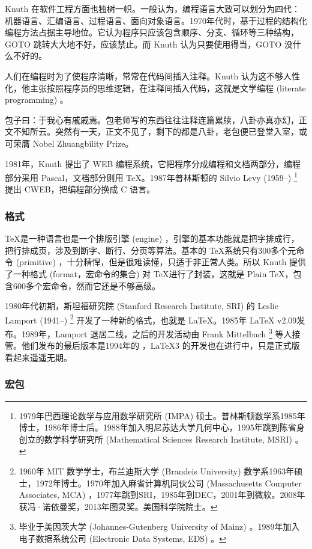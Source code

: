 Knuth 在软件工程方面也独树一帜。一般认为，编程语言大致可以划分为四代：机器语言、汇编语言、过程语言、面向对象语言。1970年代时，基于过程的结构化编程方法占据主导地位。它认为程序只应该包含顺序、分支、循环等三种结构，GOTO 跳转大大地不好，应该禁止。而 Knuth 认为只要使用得当，GOTO 没什么不好的。

人们在编程时为了使程序清晰，常常在代码间插入注释。Knuth 认为这不够人性化，他主张按照程序员的思维逻辑，在注释间插入代码，这就是文学编程 (literate programming) 。

包子曰：于我心有戚戚焉。包老师写的东西往往注释连篇累牍，八卦亦真亦幻，正文不知所云。突然有一天，正文不见了，剩下的都是八卦，老包便已登堂入室，或可荣膺 Nobel Zhuangbility Prize。

1981年，Knuth\indexKnuth{} 提出了 WEB 编程系统，它把程序分成编程和文档两部分，编程部分采用 Pascal，文档部分则用 \TeX。1987年普林斯顿的 Silvio Levy (1959--)\indexLevy{} \footnote{1979年巴西理论数学与应用数学研究所 (IMPA) 硕士。普林斯顿数学系1985年博士，1986年博士后。1988年加入明尼苏达大学几何中心，1995年跳到陈省身创立的数学科学研究所 (Mathematical Sciences Research Institute, MSRI) 。} 提出 CWEB，把编程部分换成 C 语言。

\subsubsection{格式}

\TeX 是一种语言也是一个排版引擎 (engine) ，引擎的基本功能就是把字排成行，把行排成页，涉及到断字、断行、分页等算法。基本的 \TeX 系统只有300多个元命令 (primitive) ，十分精悍，但是很难读懂，只适于非正常人类。所以 Knuth 提供了一种格式 (format，宏命令的集合) 对 \TeX 进行了封装，这就是 Plain \TeX ，包含600多个宏命令，然而它还是不够高级。

1980年代初期，斯坦福研究院 (Stanford Research Institute, SRI) 的 Leslie Lamport (1941--)\indexLamport{} \footnote{1960年 MIT 数学学士，布兰迪斯大学 (Brandeis University) 数学系1963年硕士，1972年博士。1970年加入麻省计算机同伙公司 (Massachusetts Computer Associates, MCA) ，1977年跳到SRI，1985年到DEC，2001年到微软。2008年获冯·诺依曼奖，2013年图灵奖。美国科学院院士。} 开发了一种新的格式，也就是 \LaTeX。1985年 \LaTeX{} v2.09发布。1989年，Lamport 退居二线，之后的开发活动由 Frank Mittelbach\indexMittelbach{} \footnote{毕业于美因茨大学 (Johannes-Gutenberg University of Mainz) 。1989年加入电子数据系统公司 (Electronic Data Systems, EDS) 。} 等人接管。他们发布的最后版本是1994年的 \LaTeXe，\LaTeX 3 的开发也在进行中，只是正式版看起来遥遥无期。

\subsubsection{宏包}

